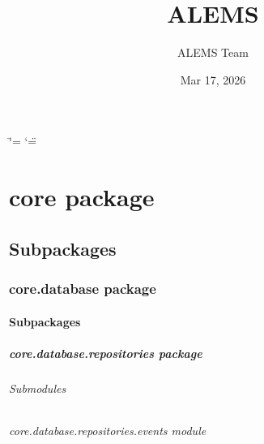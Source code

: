 \documentclass[letterpaper,10pt,english]{sphinxmanual}
\title{A\sphinxhyphen{}LEMS}
\date{Mar 17, 2026}
\author{A\sphinxhyphen{}LEMS Team}
\begin{document}
\ifdefined\shorthandoff
  \ifnum\catcode`\=\string=\active\shorthandoff{=}\fi
  \ifnum\catcode`\"=\active{}\fi
\fi

\pagestyle{empty}
\sphinxmaketitle
\pagestyle{plain}
\sphinxtableofcontents
\pagestyle{normal}
\label{\detokenize{index::doc}}


\sphinxstepscope


\chapter{core package}
\label{\detokenize{core:core-package}}\label{\detokenize{core::doc}}

\section{Subpackages}
\label{\detokenize{core:subpackages}}
\sphinxstepscope


\subsection{core.database package}
\label{\detokenize{core.database:core-database-package}}\label{\detokenize{core.database::doc}}

\subsubsection{Subpackages}
\label{\detokenize{core.database:subpackages}}
\sphinxstepscope


\paragraph{core.database.repositories package}
\label{\detokenize{core.database.repositories:core-database-repositories-package}}\label{\detokenize{core.database.repositories::doc}}

\subparagraph{Submodules}
\label{\detokenize{core.database.repositories:submodules}}
\sphinxstepscope


\subparagraph{core.database.repositories.events module}
\label{\detokenize{core.database.repositories.events:module-core.database.repositories.events}}\label{\detokenize{core.database.repositories.events:core-database-repositories-events-module}}\label{\detokenize{core.database.repositories.events::doc}}
\end{document}
